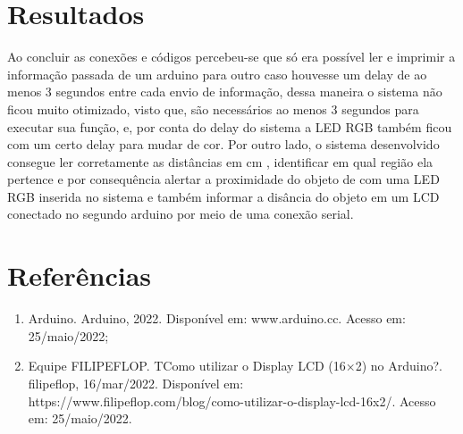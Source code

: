 \documentclass[conference]{IEEEtran}
\begin{document}
\section{Resultados}
 Ao concluir as conexões e códigos percebeu-se que só era possível ler e imprimir a informação passada de um arduino para outro caso houvesse um delay de ao menos 3 segundos
 entre cada envio de informação, dessa maneira o sistema não ficou muito otimizado, visto que, são necessários ao menos 3 segundos para executar sua função, e, por conta
 do delay do sistema a LED RGB também ficou com um certo delay para mudar de cor. Por outro lado, o sistema desenvolvido consegue ler corretamente as distâncias em cm 
 , identificar em qual região ela pertence e por consequência alertar a proximidade do objeto de com uma LED RGB inserida no sistema e também informar a disância do objeto
 em um LCD conectado no segundo arduino por meio de uma conexão serial.

\section*{Referências}

\begin{enumerate}
    \item Arduino. Arduino, 2022. Disponível em: www.arduino.cc. Acesso em: 25/maio/2022;
    \item Equipe FILIPEFLOP. TComo utilizar o Display LCD (16×2) no Arduino?. filipeflop, 16/mar/2022. Disponível em: https://www.filipeflop.com/blog/como-utilizar-o-display-lcd-16x2/. Acesso em: 25/maio/2022.
\end{enumerate}
\end{document}
